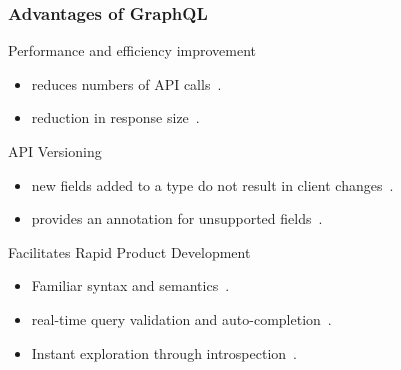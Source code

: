 \begin{frame}\frametitle{Advantages of GraphQL}


\begin{block}{Performance and efficiency improvement}
\begin{itemize}
  \item reduces numbers of API calls~\cite{migrating-to-gql}.
  \item reduction in response size~\cite{migrating-to-gql}.
\end{itemize}
\end{block}

\begin{block}{API Versioning}
\begin{itemize}
  \item new fields added to a type do not result in client changes~\cite{migrating-to-gql}. 
  \item provides an  annotation for unsupported fields~\cite{migrating-to-gql}. 
\end{itemize}

\end{block}

\begin{block}{Facilitates Rapid Product Development}
\begin{itemize}
  \item  Familiar syntax and semantics~\cite{rest-vs-gql-controlled-experiment}.
  \item real-time query validation and auto-completion~\cite{rest-vs-gql-controlled-experiment,migrating-to-gql}.
  \item Instant exploration through introspection~\cite{migrating-to-gql}. 
\end{itemize}

\end{block}

\end{frame}

